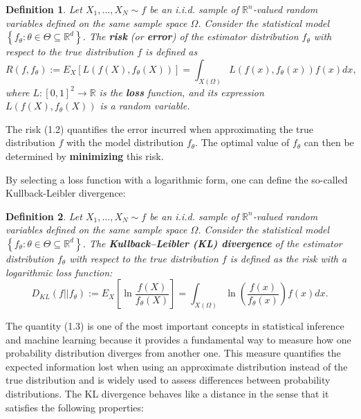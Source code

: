 \documentclass{report}
\newtheorem{definition}{Definition}[chapter]
\begin{document}
\begin{definition}
Let $X_1,\dots,X_N \sim f$ be an i.i.d. sample of $\mathbb{R}^n$-valued random variables defined on the same sample space $\Omega$. Consider the statistical model $\left\{f_\theta :\theta\in\Theta\subseteq\mathbb{R}^d\right\}$. The \textbf{risk} (or \textbf{error}) of the estimator distribution $f_\theta$ with respect to the true distribution $f$ is defined as
\begin{equation}
R(f,f_\theta) := E_X[L(f(X),f_\theta(X))] = \int_{X(\Omega)} L(f(x),f_\theta(x))f(x)dx,
\end{equation}
where $L : [0,1]^2 \to \mathbb{R}$ is the \textbf{loss} function, and its expression $L(f(X), f_\theta(X))$ is a random variable.
\end{definition}

The risk (1.2) quantifies the error incurred when approximating the true distribution $f$ with the model distribution $f_\theta$. The optimal value of $f_\theta$ can then be determined by \textbf{minimizing} this risk.

By selecting a loss function with a logarithmic form, one can define the so-called Kullback-Leibler divergence:

\begin{definition}
Let $X_1,\dots,X_N \sim f$ be an i.i.d. sample of $\mathbb{R}^n$-valued random variables defined on the same sample space $\Omega$. Consider the statistical model $\left\{f_\theta :\theta\in\Theta\subseteq\mathbb{R}^d\right\}$. The \textbf{Kullback–Leibler (KL) divergence} of the estimator distribution $f_\theta$ with respect to the true distribution $f$ is defined as the risk with a logarithmic loss function:
\begin{equation}
D_{KL}(f||f_\theta) := E_X\left [\ln \frac{f(X)}{f_\theta(X)} \right] = \int_{X(\Omega)} \ln \left ( \frac{f(x)}{f_\theta(x)} \right )f(x)dx.
\end{equation}
\end{definition}

The quantity (1.3) is one of the most important concepts in statistical inference and machine learning because it provides a fundamental way to measure how one probability distribution diverges from another one. This measure quantifies the expected information lost when using an approximate distribution instead of the true distribution and is widely used to assess differences between probability distributions. The KL divergence behaves like a distance in the sense that it satisfies the following properties:
\end{document}
